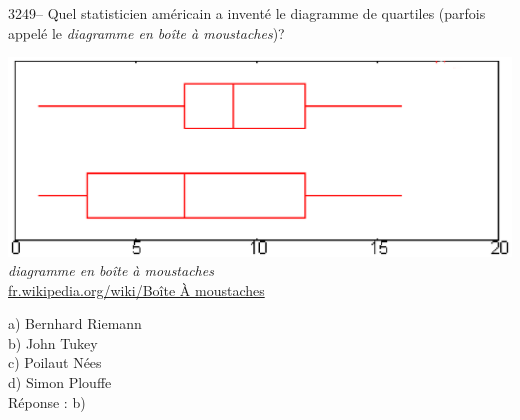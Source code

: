 \documentclass[letterpaper, 12pt]{article}
\begin{document}
3249-- Quel statisticien am\'ericain a invent\'e le diagramme de quartiles (parfois appel\'e le \emph{diagramme en bo\^ite \`a moustaches})?
\begin{center}
\includegraphics[scale=0.5]{Boite_a_moustaches.eps}\\
\emph{{\small diagramme en bo\^ite \`a moustaches}}\\
\href{http://fr.wikipedia.org/wiki/Bo\%C3\%AEte_\%C3\%A0_moustaches}{fr.wikipedia.org/wiki/Bo\^ite \`A moustaches}\\[5mm]
\end{center}

a) Bernhard Riemann\\
b) John Tukey\\
c) Poilaut N\'ees\\
d) Simon Plouffe\\

R\'eponse : b)\\
\end{document}
